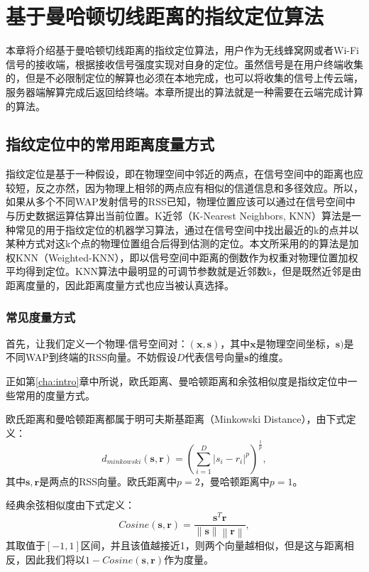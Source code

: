 \chapter{基于曼哈顿切线距离的指纹定位算法}
\label{cha:fingerprint}

本章将介绍基于曼哈顿切线距离的指纹定位算法，用户作为无线蜂窝网或者Wi-Fi信号的接收端，根据接收信号强度实现对自身的定位。虽然信号是在用户终端收集的，但是不必限制定位的解算也必须在本地完成，也可以将收集的信号上传云端，服务器端解算完成后返回给终端。本章所提出的算法就是一种需要在云端完成计算的算法。

\section{指纹定位中的常用距离度量方式}

指纹定位是基于一种假设，即在物理空间中邻近的两点，在信号空间中的距离也应较短，反之亦然，因为物理上相邻的两点应有相似的信道信息和多径效应。所以，如果从多个不同WAP发射信号的RSS已知，物理位置应该可以通过在信号空间中与历史数据运算估算出当前位置。K近邻（K-Nearest Neighbors, KNN）算法是一种常见的用于指纹定位的机器学习算法，通过在信号空间中找出最近的k的点并以某种方式对这k个点的物理位置组合后得到估测的定位。本文所采用的的算法是加权KNN（Weighted-KNN），即以信号空间中距离的倒数作为权重对物理位置加权平均得到定位。KNN算法中最明显的可调节参数就是近邻数k，但是既然近邻是由距离度量的，因此距离度量方式也应当被认真选择。

\subsection{常见度量方式}

首先，让我们定义一个物理-信号空间对：$(\mathbf{x}, \mathbf{s})$，其中$\mathbf{x}$是物理空间坐标，$\mathbf{s})$是不同WAP到终端的RSS向量。不妨假设$D$代表信号向量$\mathbf{s}$的维度。

正如第\ref{cha:intro}章中所说，欧氏距离、曼哈顿距离和余弦相似度是指纹定位中一些常用的度量方式。

欧氏距离和曼哈顿距离都属于明可夫斯基距离（Minkowski Distance），由下式定义：
\begin{equation}
d_{minkowski}(\mathbf{s}, \mathbf{r}) = \left(\sum_{i=1}^{D} {{\left| s_i - r_i \right|}^p}\right)^{\frac{1}{p}}, \label{eq:minkowski}
\end{equation}
其中$\mathbf{s}, \mathbf{r}$是两点的RSS向量。欧氏距离中$p=2$，曼哈顿距离中$p=1$。

经典余弦相似度由下式定义：
\begin{equation}
Cosine(\mathbf{s}, \mathbf{r}) = \frac{\mathbf{s}^T\mathbf{r}}{\left\|\mathbf{s}\right\|\left\|\mathbf{r}\right\|}, \label{eq:cosine}
\end{equation}
其取值于$[-1, 1]$区间，并且该值越接近1，则两个向量越相似，但是这与距离相反，因此我们将以$1 - Cosine(\mathbf{s}, \mathbf{r})$作为度量。

